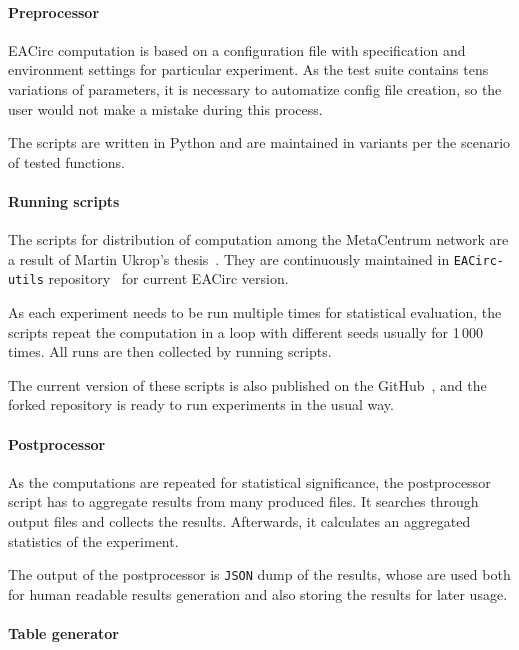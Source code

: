 \documentclass[
  print, %
  Table,   %
  nolof,     %
  nolot,     %
  11pt, %
  oneside  %
]{fithesis3}
\begin{document}
\paragraph{Preprocessor}

EACirc computation is based on a configuration file with specification and environment settings for particular experiment. As the test suite contains tens variations of parameters, it is necessary to automatize config file creation, so the user would not make a mistake during this process.

The scripts are written in Python and are maintained in variants per the scenario of tested functions.

\paragraph{Running scripts}

The scripts for distribution of computation among the MetaCentrum network are a result of Martin Ukrop's thesis~\cite{ukropMgrThesis}. They are continuously maintained in \texttt{EACirc-utils} repository~\cite{eaUtils} for current EACirc version.

As each experiment needs to be run multiple times for statistical evaluation, the scripts repeat the computation in a loop with different seeds usually for 1\,000 times. All runs are then collected by running scripts.

The current version of these scripts is also published on the GitHub~\cite{eaUtils}, and the forked repository is ready to run experiments in the usual way.

\paragraph{Postprocessor}

As the computations are repeated for statistical significance, the postprocessor script has to aggregate results from many produced files. It searches through output files and collects the results. Afterwards, it calculates an aggregated statistics of the experiment.

The output of the postprocessor is \texttt{JSON} dump of the results, whose are used both for human readable results generation and also storing the results for later usage.

\paragraph{Table generator}
\end{document}
